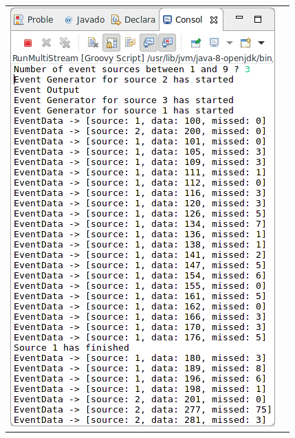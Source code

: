 \begin{tabular}{c|c}

	\includegraphics[width=\textwidth/2]{img/screenshots/9-3-2-1.png} &

\end{tabular}
